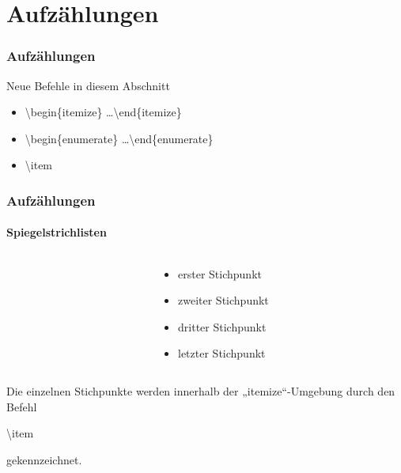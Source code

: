 \section{Aufz\"ahlungen}
\begin{frame}
\frametitle{Aufzählungen}

\begin{block}{Neue Befehle in diesem Abschnitt}
\begin{itemize}
\item \color{unibablueI}\textbackslash begin\color{black}\{itemize\} \ldots \color{unibablueI}\textbackslash end\color{black}\{itemize\} 
\item \color{unibablueI}\textbackslash begin\color{black}\{enumerate\} \ldots \color{unibablueI}\textbackslash end\color{black}\{enumerate\} 
\item \color{nounibaredI}\textbackslash item\color{black}
\end{itemize}
\end{block}
\end{frame}

\begin{frame}
\frametitle{Aufzählungen}
\framesubtitle{Spiegelstrichlisten}

\begin{columns}
\begin{column}{.5\textwidth}
\begin{ttfamily}

\end{ttfamily}
\end{column}
\begin{column}{.5\textwidth}
\begin{itemize}
\item erster Stichpunkt
\item zweiter Stichpunkt
\item dritter Stichpunkt
\item letzter Stichpunkt
\end{itemize}
\end{column}
\end{columns}
\bigskip

Die einzelnen Stichpunkte werden innerhalb der „itemize“-Umgebung durch den Befehl \begin{ttfamily}\color{nounibaredI}\textbackslash item\color{black}\end{ttfamily} gekennzeichnet.
\end{frame}

